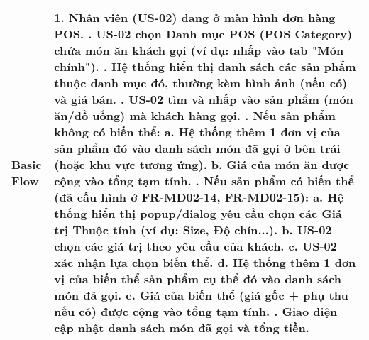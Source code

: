\begin{longtable}{|m{4cm}|p{11cm}|}
Basic Flow & 1. Nhân viên (US-02) đang ở màn hình đơn hàng POS. \newline 2. US-02 chọn Danh mục POS (POS Category) chứa món ăn khách gọi (ví dụ: nhấp vào tab "Món chính"). \newline 3. Hệ thống hiển thị danh sách các sản phẩm thuộc danh mục đó, thường kèm hình ảnh (nếu có) và giá bán. \newline 4. US-02 tìm và nhấp vào sản phẩm (món ăn/đồ uống) mà khách hàng gọi. \newline 5. \textbf{Nếu sản phẩm không có biến thể:} \newline    a. Hệ thống thêm 1 đơn vị của sản phẩm đó vào danh sách món đã gọi ở bên trái (hoặc khu vực tương ứng). \newline    b. Giá của món ăn được cộng vào tổng tạm tính. \newline 6. \textbf{Nếu sản phẩm có biến thể (đã cấu hình ở FR-MD02-14, FR-MD02-15):} \newline    a. Hệ thống hiển thị popup/dialog yêu cầu chọn các Giá trị Thuộc tính (ví dụ: Size, Độ chín...). \newline    b. US-02 chọn các giá trị theo yêu cầu của khách. \newline    c. US-02 xác nhận lựa chọn biến thể. \newline    d. Hệ thống thêm 1 đơn vị của biến thể sản phẩm cụ thể đó vào danh sách món đã gọi. \newline    e. Giá của biến thể (giá gốc + phụ thu nếu có) được cộng vào tổng tạm tính. \newline 7. Giao diện cập nhật danh sách món đã gọi và tổng tiền. \\
\hline

\end{longtable}
